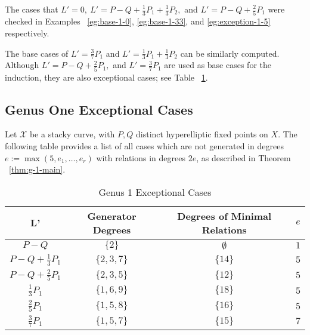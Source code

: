 \documentclass{amsart}
\theoremstyle{plain}
\theoremstyle{definition}
\theoremstyle{remark}
\newtheorem{rem}[thm]{Remark}
\numberwithin{equation}{section}
\newcommand\ssec{\subsection}
\newcommand\sx{\mathscr X}
\begin{document}
The cases that $L' = 0, \: L' = P-Q +\frac{1}{3}P_1 + \frac{1}{3}P_2,$ and $L' = P-Q + \frac{2}{5}P_1$ were checked in Examples ~\ref{eg:base-1-0}, \ref{eg:base-1-33}, and \ref{eg:exception-1-5} respectively.

The base cases of $L' = \frac{3}{7}P_1$ and $L' = \frac{1}{3}P_1 +\frac{1}{3}P_2$ can be similarly computed. Although $L' = P - Q + \frac{2}{5}P_1,$ and $L' = \frac{3}{7}P_1$ are used as base cases for the induction, they are also exceptional cases; see Table ~\ref{table:g-1-exceptional}.

\ssec{Genus One Exceptional Cases}
\label{ssec:g-1-exceptional}
Let $\sx$ be a stacky curve, with $P, Q$ distinct hyperelliptic
fixed points on $X$. The following table provides a list of all
cases which are not generated in degrees $e := \max(5, e_1, \ldots,
e_r)$ with relations in degrees $2e$, as described in Theorem
~\ref{thm:g-1-main}.

\begin{table}	
\begin{tabular}
{| c || c | c | c |}
	\hline
	L' & Generator Degrees & Degrees of Minimal Relations & $e$ \\
	\hline
	\hline
	$P - Q$ & $\{2\}$ & $\emptyset$ & $1$\\	\hline

	$P - Q + \frac{1}{3} P_1$ & $\{2, 3, 7\}$ & $\{14\}$ & $5$ \\	\hline

	$P - Q + \frac{2}{5} P_1$ & $\{2, 3, 5\}$ & $\{12\}$ & $5$\\	\hline
	
	$\frac{1}{3} P_1$ & $\{1, 6, 9\}$ & $\{18\}$ & $5$ \\	\hline

	$\frac{2}{5} P_1$ & $\{1, 5, 8\}$ & $\{16\}$ & $5$ \\	\hline
	
	$\frac{3}{7} P_1$ & $\{1, 5, 7\}$ & $\{15\}$ & $7$ \\	\hline
	\end{tabular}
	\caption{Genus 1 Exceptional Cases}
	\label{table:g-1-exceptional}
	
\end{table}

\end{document}
